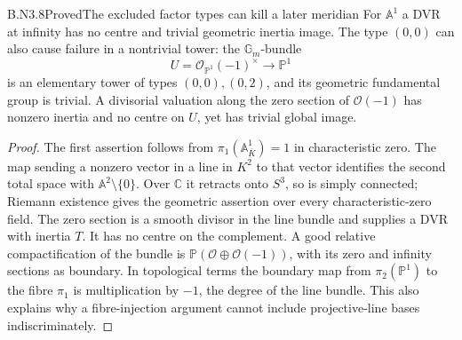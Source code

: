 \begin{claim}{B.N3.8}{Proved}{The excluded factor types can kill a later meridian}
For $\mathbb A^1$ a DVR at infinity has no centre and trivial
geometric inertia image.  The type $(0,0)$ can also cause failure in
a nontrivial tower: the $\mathbb G_m$-bundle
\[
 U=\mathcal O_{\mathbb P^1}(-1)^\times\longrightarrow\mathbb P^1
\]
is an elementary tower of types $(0,0),(0,2)$, and its geometric
fundamental group is trivial.  A divisorial valuation along the zero
section of $\mathcal O(-1)$ has nonzero inertia and no centre on
$U$, yet has trivial global image.
\end{claim}
\begin{proof}
The first assertion follows from
$\pi_1(\mathbb A^1_{\overline K})=1$ in characteristic zero.
The map sending a nonzero vector in a line in $K^2$ to that vector
identifies the second total space with $\mathbb A^2\setminus\{0\}$.
Over $\mathbb C$ it retracts onto $S^3$, so is simply connected;
Riemann existence gives the geometric assertion over every
characteristic-zero field.  The zero section is a smooth divisor in
the line bundle and supplies a DVR with inertia $T$.  It has no
centre on the complement.  A good relative compactification of the
bundle is $\mathbb P(\mathcal O\oplus\mathcal O(-1))$, with its
zero and infinity sections as boundary.  In topological terms the
boundary map from $\pi_2(\mathbb P^1)$ to the fibre $\pi_1$ is
multiplication by $-1$, the degree of the line bundle.  This also
explains why a fibre-injection argument cannot include projective-line
bases indiscriminately.
\end{proof}

